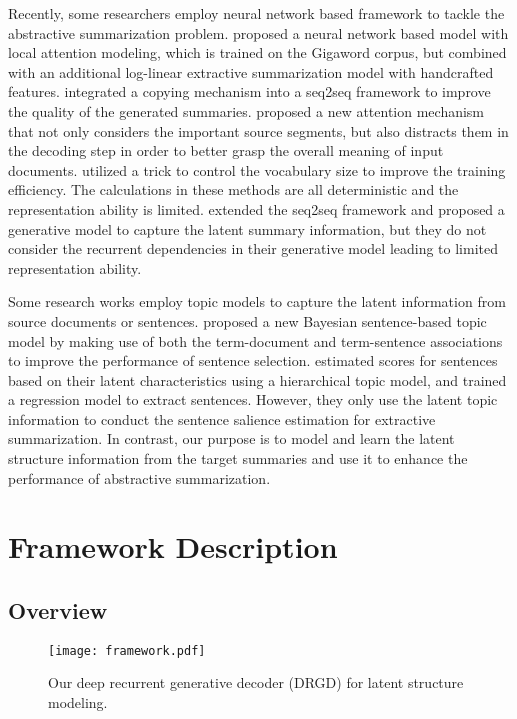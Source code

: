\documentclass[11pt,letterpaper]{article}
\begin{document}
Recently, some researchers employ neural network based framework to tackle the abstractive summarization problem.
\citet{rush2015neural} proposed a neural network based model with local attention modeling, which is trained on the Gigaword corpus, but combined with an additional log-linear extractive summarization model with handcrafted features.
\citet{gu2016incorporating} integrated a copying mechanism into a seq2seq framework to improve the quality of the generated summaries.
\citet{chen2016distraction} proposed a new attention mechanism that not only considers the important source segments, but also distracts them in the decoding step in order to better grasp the overall meaning of input documents.
\citet{nallapati2016abstractive} utilized a trick to control the vocabulary size to improve the training efficiency. 
The calculations in these methods are all deterministic and the representation ability is limited.
\citet{miao2016language} extended the seq2seq framework and proposed a generative model to capture the latent summary information, but they do not consider the recurrent dependencies in their generative model leading to limited representation ability.

Some research works employ topic models to capture the latent information from source documents or sentences.
\citet{wang2009multi} proposed a new Bayesian sentence-based topic model by making use of both the term-document and term-sentence associations to improve the performance of sentence selection.
\citet{celikyilmaz2010hybrid} estimated scores for sentences based
on their latent characteristics using a hierarchical topic model, and trained a regression model to extract sentences.
However, they only use the latent topic information to conduct the sentence salience estimation for extractive summarization.
In contrast, our purpose is to model and learn the latent structure information from the target summaries and use it to enhance the performance of abstractive summarization.

\section{Framework Description}

\subsection{Overview}

\begin{figure*}[!t]
	\centering
	\texttt{[image: framework.pdf]}
	\caption{Our deep recurrent generative decoder (DRGD) for latent structure modeling.}
	\label{fig:framework}
\end{figure*}
\end{document}
